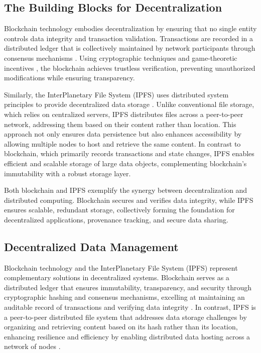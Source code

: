 \documentclass[final]{rc-book-2.14}
\begin{document}
\subsection{The Building Blocks for Decentralization}

Blockchain technology embodies decentralization by ensuring that no single entity controls data integrity and transaction validation. Transactions are recorded in a distributed ledger that is collectively maintained by network participants through consensus mechanisms \cite{nakamoto2008bitcoin}. Using cryptographic techniques \cite{katz2020introduction} and game-theoretic incentives \cite{roughgarden2016twentyone}, the blockchain achieves trustless verification, preventing unauthorized modifications while ensuring transparency.

Similarly, the InterPlanetary File System (IPFS) uses distributed system principles to provide decentralized data storage \cite{benet2014ipfs}. Unlike conventional file storage, which relies on centralized servers, IPFS distributes files across a peer-to-peer network, addressing them based on their content rather than location. This approach not only ensures data persistence but also enhances accessibility by allowing multiple nodes to host and retrieve the same content. In contrast to blockchain, which primarily records transactions and state changes, IPFS enables efficient and scalable storage of large data objects, complementing blockchain’s immutability with a robust storage layer.

Both blockchain and IPFS exemplify the synergy between decentralization and distributed computing. Blockchain secures and verifies data integrity, while IPFS ensures scalable, redundant storage, collectively forming the foundation for decentralized applications, provenance tracking, and secure data sharing.

\subsection{Decentralized Data Management}

Blockchain technology and the InterPlanetary File System (IPFS) represent complementary solutions in decentralized systems. Blockchain serves as a distributed ledger that ensures immutability, transparency, and security through cryptographic hashing and consensus mechanisms, excelling at maintaining an auditable record of transactions and verifying data integrity \cite{nakamoto2008bitcoin}. In contrast, IPFS is a peer-to-peer distributed file system that addresses data storage challenges by organizing and retrieving content based on its hash rather than its location, enhancing resilience and efficiency by enabling distributed data hosting across a network of nodes \cite{benet2014ipfs}.
\end{document}
